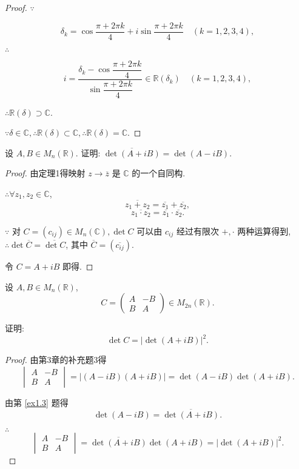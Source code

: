 \documentclass[UTF8]{ctexart}
\begin{document}
\begin{proof}
    $\because$

    \[\delta_k=\cos\dfrac{\pi+2\pi k}{4}+i\sin\dfrac{\pi+2\pi k}{4}\quad(k=1,2,3,4),\]

    $\therefore$

    \[i=\dfrac{\delta_k-\cos\dfrac{\pi+2\pi k}{4}}{\sin\dfrac{\pi+2\pi k}{4}}\in\mathbb{R}(\delta_k)\quad(k=1,2,3,4),\]

    $\therefore\mathbb{R}(\delta)\supset\mathbb{C}$.

    $\because\delta\in\mathbb{C},\therefore\mathbb{R}(\delta)\subset\mathbb{C},\therefore\mathbb{R}(\delta)=\mathbb{C}$.
\end{proof}
\begin{exercise}\label{ex1.3}
    设 $A,B\in M_n(\mathbb{R})$. 证明: $\overline{\det(A+iB)}=\det(A-iB)$.
\end{exercise}
\begin{proof}
    由定理1得映射 $z\to\overline{z}$ 是 $\mathbb{C}$ 的一个自同构.

    $\therefore\forall z_1,z_2\in\mathbb{C}$,
    \[\overline{z_1+z_2}=\overline{z_1}+\overline{z_2},\]
    \[\overline{z_1\cdot z_2}=\overline{z_1}\cdot\overline{z_2}.\]

    $\because$ 对 $C=(c_{ij})\in M_n(\mathbb{C}),\det C$ 可以由 $c_{ij}$ 经过有限次 $+,\cdot$ 两种运算得到, $\therefore\det\overline{C}=\overline{\det C}$, 其中 $\overline{C}=(\overline{c_{ij}})$.

    令 $C=A+iB$ 即得.
\end{proof}
\begin{exercise}\label{ex1.4}
    设 $A,B\in M_n(\mathbb{R})$,
    \[C=\begin{pmatrix}
        A & -B \\
        B & A
    \end{pmatrix}\in M_{2n}(\mathbb{R}).\]

    证明:
    \[\det C=|\det(A+iB)|^2.\]
\end{exercise}
\begin{proof}
    由第3章的补充题3得
    \[\begin{vmatrix}
        A & -B \\
        B & A
    \end{vmatrix}=|(A-iB)(A+iB)|=\det(A-iB)\det(A+iB).\]

    由第 \ref{ex1.3} 题得
    \[\det(A-iB)=\overline{\det(A+iB)}.\]

    $\therefore$
    \[\begin{vmatrix}
        A & -B \\
        B & A
    \end{vmatrix}=\overline{\det(A+iB)}\det(A+iB)=|\det(A+iB)|^2.\]
\end{proof}
\end{document}
